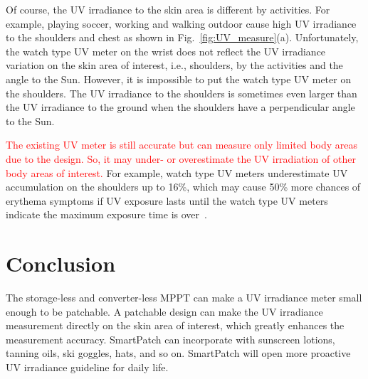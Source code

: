 \documentclass[journal]{IEEEtran}
\begin{document}
Of course, the UV irradiance to the skin area is different by activities.
For example, playing soccer, working and walking outdoor cause high UV irradiance to the shoulders and chest as shown in Fig.~\ref{fig:UV_measure}(a).
Unfortunately, the watch type UV meter on the wrist does not reflect the UV irradiance variation on the skin area of interest, i.e., shoulders, by the activities and the angle to the Sun.
However, it is impossible to put the watch type UV meter on the shoulders.
The UV irradiance to the shoulders is sometimes even larger than the UV irradiance to the ground when the shoulders have a perpendicular angle to the Sun.

\textcolor{red}{The existing UV meter is still accurate but can measure only limited body areas due to the design. So, it may under- or overestimate the UV irradiation of other body areas of interest.} For example, watch type UV meters underestimate UV accumulation on the shoulders up to 16\%, which may cause 50\% more chances of erythema symptoms if UV exposure lasts until the watch type UV meters indicate the maximum exposure time is over~\cite{Harrison:Method02}.

\section{Conclusion}

The storage-less and converter-less MPPT can make a UV irradiance meter small enough to be patchable.
A patchable design can make the UV irradiance measurement directly on the skin area of interest, which greatly enhances the measurement accuracy.
SmartPatch can incorporate with sunscreen lotions, tanning oils, ski goggles, hats, and so on.
SmartPatch will open more proactive UV irradiance guideline for daily life.



\end{document}
